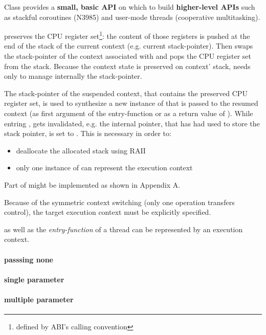 Class \ectx provides a {\bfseries small, basic API} on which to build {\bfseries
higher-level APIs} such as stackful coroutines (N3985\cite{N3985}) and user-mode
threads (cooperative multitasking).

 preserves the CPU register
set\footnote{defined by ABI's calling convention}: the content of those
registers is pushed at the end of the stack of the current context (e.g. current
stack-pointer). Then \ectxop swaps the stack-pointer of the context associated
with  and pops the CPU register set from the stack.
Because the context state is preserved on context' stack, \ectx needs only to
manage internally the stack-pointer.

The stack-pointer of the suspended context, that contains the preserved CPU
register set, is used to synthesize a new instance of \ectx that is passed to
the resumed context (as first argument of the entry-function or as a return
value of \ectxop).
While entring ,  gets
invalidated, e.g. the internal pointer, that has had used to store the stack
pointer, is set to .
This is necessary in order to:
\begin{itemize}
    \item   deallocate the allocated stack using RAII
    \item   only one instance of \ectx can represent the execution context
\end{itemize}

Part of  might be implemented as shown in
Appendix A.

Because of the symmetric context switching (only one operation transfers
control), the target execution context must be explicitly specified.

\main as well as the \emph{entry-function} of a thread can be represented by an
execution context.


\paragraph*{passsing none}
\paragraph*{single parameter}
\paragraph*{multiple parameter}
